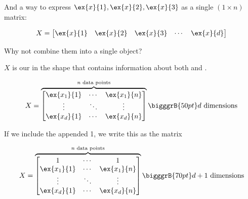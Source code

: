         And a way to express $\ex{x}{1}, \ex{x}{2}, \ex{x}{3}$ as a single $(1 \times n)$ matrix:
        
        \begin{equation}
            X =
                \begin{bmatrix}
                  \ex{x}{1} & \ex{x}{2} & \ex{x}{3} & \cdots & \ex{x}{d}
                \end{bmatrix}
        \end{equation}
        
        Why not combine them into a single object?\\
        
        \begin{kequation}
            $X$ is our  in the shape  that contains information about both  and .
            
            \begin{equation}
                X = 
                    \overbrace{
                        \begin{bmatrix}
                            \ex{x_1}{1} & \cdots  & \ex{x_1}{n} \\
                            \vdots      & \ddots & \vdots      \\
                            \ex{x_d}{1} & \cdots  & \ex{x_d}{n}
                        \end{bmatrix}
                        }^{ n \text{ data points}}
                    \bigggrB{50pt} d \text{ dimensions}
            \end{equation}

        \end{kequation}
        
        If we include the appended 1, we write this as the  matrix
        
        \begin{equation}
                X = 
                    \overbrace{
                        \begin{bmatrix}
                            1           & \cdots & 1           \\
                            \ex{x_1}{1} & \cdots  & \ex{x_1}{n} \\
                            \vdots      & \ddots & \vdots      \\
                            \ex{x_d}{1} & \cdots  & \ex{x_d}{n}
                        \end{bmatrix}
                        }^{ n \text{ data points}}
                    \bigggrB{70pt} d+1 \text{ dimensions}
        \end{equation}
        
